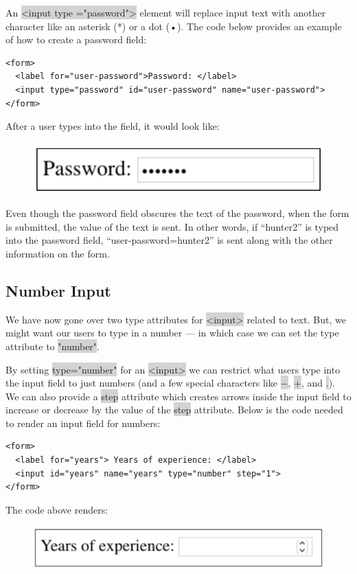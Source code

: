 \documentclass[11pt]{article}
\begin{document}
An \colorbox{lightgray}{<input type ="password">} element will replace input text with another character like an asterisk (*) or a dot (•). The code below provides an example of how to create a password field:
\begin{lstlisting}
<form>
  <label for="user-password">Password: </label>
  <input type="password" id="user-password" name="user-password">
</form>
\end{lstlisting}
After a user types into the field, it would look like:
\begin{figure}[H]
\includegraphics[scale = 0.5]{3_6}
\centering
\end{figure}
\vspace{-4mm}
Even though the password field obscures the text of the password, when the form is submitted, the value of the text is sent. In other words, if “hunter2” is typed into the password field, “user-password=hunter2” is sent along with the other information on the form.

\subsection{Number Input}
We have now gone over two type attributes for \colorbox{lightgray}{<input>} related to text. But, we might want our users to type in a number — in which case we can set the type attribute to \colorbox{lightgray}{"number"}. 

By setting \colorbox{lightgray}{type="number"} for an \colorbox{lightgray}{<input>} we can restrict what users type into the input field to just numbers (and a few special characters like \colorbox{lightgray}{$-$}, \colorbox{lightgray}{$+$}, and \colorbox{lightgray}{$.$}). We can also provide a \colorbox{lightgray}{step} attribute which creates arrows inside the input field to increase or decrease by the value of the \colorbox{lightgray}{step} attribute. Below is the code needed to render an input field for numbers:
\begin{lstlisting}
<form>
  <label for="years"> Years of experience: </label>
  <input id="years" name="years" type="number" step="1">
</form>
\end{lstlisting}
The code above renders:
\begin{figure}[H]
\includegraphics[scale = 0.4]{3_7}
\centering
\end{figure}
\vspace{-4mm}
\end{document}
